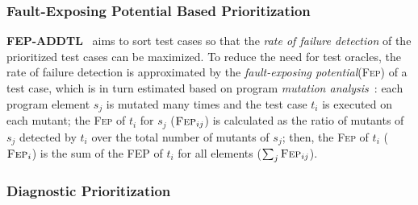 \subsubsection{Fault-Exposing Potential Based Prioritization}
\textbf{\textsc{F{\scriptsize EP}-A{\scriptsize DDTL}}}~\citep{RUCH01} aims to sort test cases so that the {\em rate of failure detection}
of the prioritized test cases can be maximized. To reduce the need for test oracles, the rate of failure detection is approximated by the
{\em fault-exposing potential}(\textsc{Fep}) of a test case, which is in turn estimated based on program {\em mutation analysis}~\citep{RGHamlet1977}:
each program element $s_j$ is mutated many times and
the test case $t_i$ is executed on each mutant; the \textsc{Fep} of $t_i$ for $s_j$ ($\textsc{Fep}_{ij}$) is calculated as
the ratio of mutants of $s_j$ detected by $t_i$ over the total number of
mutants of $s_j$; then, the \textsc{Fep} of $t_i$ ($\textsc{Fep}_i$) is the sum of the FEP of $t_i$ for all elements ($\sum_{j}\textsc{Fep}_{ij}$).

\subsubsection{Diagnostic Prioritization}\label{subsubsec.dp}
\begin{comment}
There are many techniques proposed to automatically generate a large number of test inputs. However, there are only a few methods that could automatically generate test oracles which are often limited to a certain family of failures, e.g.,~\citep{Artzi2010,Xie06}. In post-mortem study, test oracles can be obtained by running test cases on the correct program (see Figure~\ref{fig:problem}(A)). In practice, however, the code base contains faults and developers are not aware of its location unless testing and debugging are performed. Therefore, the fault-free version of the program is absent and testers have to manually create test oracles for each input, or check the correctness of program output one by one, both of which are laborious (see Figure~\ref{fig:problem}(B)).

Diagnostic prioritization is proposed to deal with this problem. Diagnostic prioritization select and prioritize a relatively smaller subset of test cases and ask users to label the test outcome. The goal of test case prioritization and diagnostic prioritization is different though; while test case prioritization is often employed to reduce the amount of time needed to run all tests, diagnostic prioritization would like to reduce the number of test cases that need manual labeling and yet optimize fault localization accuracy. The problem of running too many test cases is not important in diagnostic prioritization as the key issue to be solved is the lack of test cases (with available oracles). We define this problem in Definition~\ref{defn:diagnosticpriori}.

\subsubsection{Existing Methods}
\end{comment}

